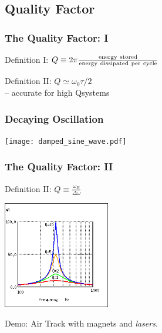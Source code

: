 \documentclass[pdf,hideothersubsections]{beamer}
\begin{document}
\subsection{Quality Factor}
\begin{frame}
\frametitle{The Quality Factor: I}
\pause
\begin{block}{Definition I:}
$Q \equiv 2 \pi \frac{\rm energy~stored}{\rm energy~dissipated~per~cycle}$
\end{block}
\pause
\begin{block}{Definition II:}
$Q \simeq \omega_0 \tau / 2$ \\
-- accurate for high Q\footnotemark systems
\end{block}


\end{frame}

\begin{frame}
\frametitle{Decaying Oscillation}

\centering
\texttt{[image: damped\_sine\_wave.pdf]}

\end{frame}



\begin{frame}
\frametitle{The Quality Factor: II}

\begin{block}{Definition II:}
$Q \equiv \frac{\omega_R}{\Delta \omega}$
\end{block}
\pause
\centering
\includegraphics[width=0.35\textwidth]{LorentzianQ.png}

Demo: Air Track with magnets and \emph{lasers}.

\end{frame}
\end{document}
